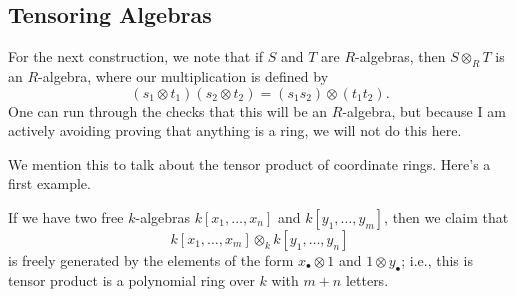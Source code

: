 \subsection{Tensoring Algebras}
For the next construction, we note that if $S$ and $T$ are $R$-algebras, then $S\otimes_RT$ is an $R$-algebra, where our multiplication is defined by
\[(s_1\otimes t_1)(s_2\otimes t_2)=(s_1s_2)\otimes(t_1t_2).\]
One can run through the checks that this will be an $R$-algebra, but because I am actively avoiding proving that anything is a ring, we will not do this here.

We mention this to talk about the tensor product of coordinate rings. Here's a first example.
\begin{exe} \label{exe:basictensorcoordinate}
	If we have two free $k$-algebras $k[x_1,\ldots,x_n]$ and $k[y_1,\ldots,y_m]$, then we claim that
	\[k[x_1,\ldots,x_m]\otimes_kk[y_1,\ldots,y_n]\]
	is freely generated by the elements of the form $x_\bullet\otimes1$ and $1\otimes y_\bullet$; i.e., this is tensor product is a polynomial ring over $k$ with $m+n$ letters.
\end{exe}
